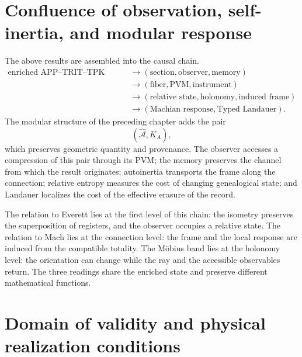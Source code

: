 \section{Confluence of observation, self-inertia, and modular response}

The above results are assembled into the causal chain.
\begin{equation}
 \begin{aligned}
 \text{enriched APP--TRIT--TPK state}
 &\longrightarrow
 (\text{section},\text{observer},\text{memory})\\
 &\longrightarrow
 (\text{fiber},\text{PVM},\text{instrument})\\
 &\longrightarrow
 (\text{relative state},\text{holonomy},\text{induced frame})\\
 &\longrightarrow
 (\text{Machian response},\text{Typed Landauer}).
 \end{aligned}
 \label{eq:rm-obs-causal-chain}
\end{equation}
The modular structure of the preceding chapter adds the pair
\begin{equation}
 (\widehat{\mathcal A},K_A),
 \label{eq:rm-obs-area-modular-pair}
\end{equation}
which preserves geometric quantity and provenance. The observer accesses a
compression of this pair through its PVM; the memory preserves the channel from
which the result originates; autoinertia transports the frame along the
connection; relative entropy measures the cost of changing genealogical
state; and Landauer localizes the cost of the effective erasure of the
record.

The relation to Everett lies at the first level of this chain: the isometry preserves the superposition of registers, and the observer occupies a relative state. The relation to Mach lies at the connection level: the frame and the local response are induced from the compatible totality. The Möbius band lies at the holonomy level: the orientation can change while the ray and the accessible observables return. The three readings share the enriched state and preserve different mathematical functions.

\section{Domain of validity and physical realization conditions}

